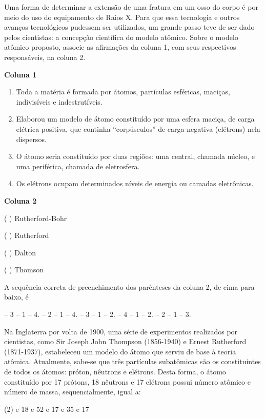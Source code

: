 \documentclass[9 pt]{scrartcl}
\def\PQ{0.84} %
\begin{document}
\begin{exercise}[points=\PQ]
Uma forma de determinar a extensão de uma fratura em um osso do corpo é por meio do uso do equipamento de Raios X. Para que essa tecnologia e outros avanços tecnológicos pudessem ser utilizados, um grande passo teve de ser dado pelos cientistas: a concepção científica do modelo atômico. Sobre o modelo atômico proposto, associe as afirmações da coluna 1, com seus respectivos responsáveis, na coluna 2.



\textbf{Coluna 1}



\begin{enumerate}
\item Toda a matéria é formada por átomos, partículas esféricas, maciças, indivisíveis e indestrutíveis.
\item Elaborou um modelo de átomo constituído por uma esfera maciça, de carga elétrica positiva, que continha “corpúsculos” de carga negativa (elétrons) nela dispersos.
\item O átomo seria constituído por duas regiões: uma central, chamada núcleo, e uma periférica, chamada de eletrosfera.
\item Os elétrons ocupam determinados níveis de energia ou camadas eletrônicas.
\end{enumerate}



\textbf{Coluna 2}



( ) Rutherford-Bohr

( ) Rutherford

( ) Dalton

( ) Thomson



A sequência correta de preenchimento dos parênteses da coluna 2, de cima para baixo, é

\begin{choice}
 – 3 – 1 – 4. 
 – 2 – 1 – 4.
 – 3 – 1 – 2. 
 – 4 – 1 – 2. 
 – 2 – 1 – 3.
\end{choice}
\end{exercise}






\begin{exercise}[points=\PQ]
Na Inglaterra por volta de 1900, uma série de experimentos realizados por cientistas, como Sir Joseph John Thompson (1856-1940) e Ernest Rutherford (1871-1937), estabeleceu um modelo do átomo que serviu de base à teoria atômica. Atualmente, sabe-se que três partículas subatômicas são os constituintes de todos os átomos: próton, nêutrons e elétrons. Desta forma, o átomo constituído por 17 prótons, 18 nêutrons e 17 elétrons possui número atômico e número de massa, sequencialmente, igual a: 

\begin{choice}(2)
 e 18 
 e 52 
 e 17 
 e 35
 e 17 
\end{choice}
\end{exercise}
\end{document}
